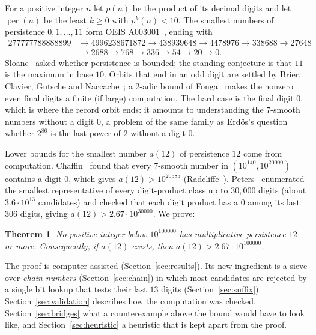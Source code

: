 \documentclass[11pt]{article}
\newtheorem{theorem}{Theorem}
\theoremstyle{definition}
\newcommand{\NBexp}{100000}
\begin{document}
For a positive integer $n$ let $p(n)$ be the product of its decimal digits and let $\operatorname{per}(n)$ be the least
$k\ge 0$ with $p^{k}(n)<10$. The smallest numbers of persistence $0,1,\dots,11$ form OEIS A003001~\cite{oeis}, ending with
\[
\begin{aligned}
  277777788888899 &\to 4996238671872 \to 438939648 \to 4478976 \to 338688 \to 27648\\
                  &\to 2688 \to 768 \to 336 \to 54 \to 20 \to 0 .
\end{aligned}
\]
Sloane~\cite{sloane} asked whether persistence is bounded; the standing conjecture is that $11$ is the maximum in base
$10$. Orbits that end in an odd digit are settled by Brier, Clavier, Gutsche and Naccache~\cite{bcgn}; a $2$-adic bound
of Fonga~\cite{fonga} makes the nonzero even final digits a finite (if large) computation. The hard case is the final
digit $0$, which is where the record orbit ends: it amounts to understanding the $7$-smooth numbers without a digit
$0$, a problem of the same family as Erd\H{o}s's question whether $2^{86}$ is the last power of $2$ without a digit $0$.

Lower bounds for the smallest number $a(12)$ of persistence $12$ come from computation. Chaffin~\cite{chaffin}
found that every $7$-smooth number in $(10^{140},10^{20000})$ contains a digit $0$, which gives $a(12)>10^{20585}$
(Radcliffe~\cite{radcliffe}). Peters~\cite{peters} enumerated the smallest representative of every digit-product
class up to $30{,}000$ digits (about $3.6\cdot 10^{13}$ candidates) and checked that each digit product has a $0$ among
its last $306$ digits, giving $a(12)>2.67\cdot 10^{30000}$. We prove:

\begin{theorem}\label{thm:main}
No positive integer below $10^{\NBexp}$ has multiplicative persistence $12$ or more. Consequently, if $a(12)$ exists,
then $a(12)>2.67\cdot 10^{\NBexp}$.
\end{theorem}

The proof is computer-assisted (Section~\ref{sec:results}). Its new ingredient is a sieve over \emph{chain numbers}
(Section~\ref{sec:chain}) in which most candidates are rejected by a single bit lookup that tests their last $13$
digits (Section~\ref{sec:suffix}). Section~\ref{sec:validation} describes how the computation was checked,
Section~\ref{sec:bridges} what a counterexample above the bound would have to look like, and
Section~\ref{sec:heuristic} a heuristic that is kept apart from the proof.
\end{document}
